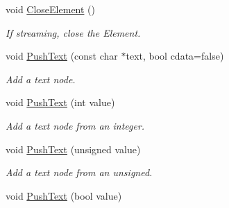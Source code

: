 \begin{DoxyCompactItemize}
\item 
\hypertarget{classtinyxml2_1_1_x_m_l_printer_aed6cce4bd414a78b3e2a824803c3ec42}{void \hyperlink{classtinyxml2_1_1_x_m_l_printer_aed6cce4bd414a78b3e2a824803c3ec42}{Close\-Element} ()}\label{classtinyxml2_1_1_x_m_l_printer_aed6cce4bd414a78b3e2a824803c3ec42}

\begin{DoxyCompactList}\small\item\em If streaming, close the Element. \end{DoxyCompactList}\item 
\hypertarget{classtinyxml2_1_1_x_m_l_printer_a1cc16a9362df4332012cb13cff6441b3}{void \hyperlink{classtinyxml2_1_1_x_m_l_printer_a1cc16a9362df4332012cb13cff6441b3}{Push\-Text} (const char $\ast$text, bool cdata=false)}\label{classtinyxml2_1_1_x_m_l_printer_a1cc16a9362df4332012cb13cff6441b3}

\begin{DoxyCompactList}\small\item\em Add a text node. \end{DoxyCompactList}\item 
\hypertarget{classtinyxml2_1_1_x_m_l_printer_a3e0d4d78de25d4cf081009e1431cea7e}{void \hyperlink{classtinyxml2_1_1_x_m_l_printer_a3e0d4d78de25d4cf081009e1431cea7e}{Push\-Text} (int value)}\label{classtinyxml2_1_1_x_m_l_printer_a3e0d4d78de25d4cf081009e1431cea7e}

\begin{DoxyCompactList}\small\item\em Add a text node from an integer. \end{DoxyCompactList}\item 
\hypertarget{classtinyxml2_1_1_x_m_l_printer_a661fb50e7e0a4918d2d259cb0fae647e}{void \hyperlink{classtinyxml2_1_1_x_m_l_printer_a661fb50e7e0a4918d2d259cb0fae647e}{Push\-Text} (unsigned value)}\label{classtinyxml2_1_1_x_m_l_printer_a661fb50e7e0a4918d2d259cb0fae647e}

\begin{DoxyCompactList}\small\item\em Add a text node from an unsigned. \end{DoxyCompactList}\item 
\hypertarget{classtinyxml2_1_1_x_m_l_printer_a4390e5fa1ed05189a8686647345ab29f}{void \hyperlink{classtinyxml2_1_1_x_m_l_printer_a4390e5fa1ed05189a8686647345ab29f}{Push\-Text} (bool value)}\label{classtinyxml2_1_1_x_m_l_printer_a4390e5fa1ed05189a8686647345ab29f}


\end{DoxyCompactItemize}
